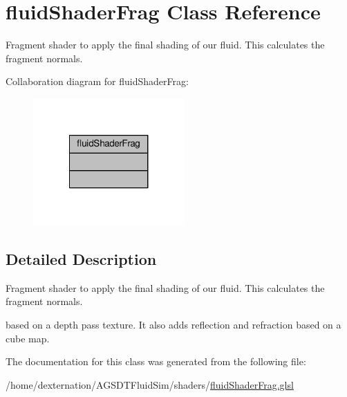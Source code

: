 \hypertarget{classfluid_shader_frag}{\section{fluid\-Shader\-Frag Class Reference}
\label{classfluid_shader_frag}
}


Fragment shader to apply the final shading of our fluid. This calculates the fragment normals.  




Collaboration diagram for fluid\-Shader\-Frag\-:\nopagebreak
\begin{figure}[H]
\begin{center}
\leavevmode
\includegraphics[width=164pt]{classfluid_shader_frag__coll__graph}
\end{center}
\end{figure}


\subsection{Detailed Description}
Fragment shader to apply the final shading of our fluid. This calculates the fragment normals. 

based on a depth pass texture. It also adds reflection and refraction based on a cube map. 

The documentation for this class was generated from the following file\-:\begin{DoxyCompactItemize}
\item 
/home/dexternation/\-A\-G\-S\-D\-T\-Fluid\-Sim/shaders/\hyperlink{fluid_shader_frag_8glsl}{fluid\-Shader\-Frag.\-glsl}\end{DoxyCompactItemize}

